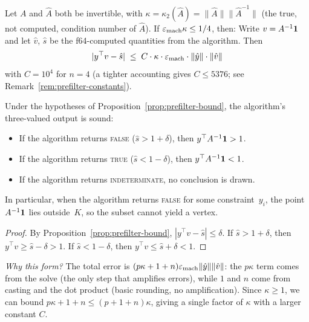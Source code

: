 \begin{unverified}
\begin{proposition}\label{prop:prefilter-bound}
Let $A$ and $\hat{A}$ both be invertible, with
$\kappa = \kappa_2(\hat{A}) = \|\hat{A}\|\|\hat{A}^{-1}\|$
(the true, not computed, condition number of $\hat{A}$).
If $\varepsilon_{\mathrm{mach}}\kappa \le 1/4$, then:
Write $v = A^{-1}\mathbf{1}$ and let $\hat{v}$, $\hat{s}$
be the f64-computed quantities from the algorithm.
Then
\[
  |y^\top v - \hat{s}|
  \;\le\;
  C \cdot \kappa \cdot \varepsilon_{\mathrm{mach}}
  \cdot \|\hat{y}\| \cdot \|\hat{v}\|
\]
with $C = 10^4$ for $n = 4$
(a tighter accounting gives $C \le 5376$; see
Remark~\ref{rem:prefilter-constants}).
\end{proposition}
\end{unverified}

\begin{unverified}
\begin{corollary}\label{cor:prefilter-soundness}
Under the hypotheses of Proposition~\ref{prop:prefilter-bound},
the algorithm's three-valued output is sound:
\begin{itemize}
\item If the algorithm returns \textsc{false}
  ($\hat{s} > 1 + \delta$), then $y^\top A^{-1}\mathbf{1} > 1$.
\item If the algorithm returns \textsc{true}
  ($\hat{s} < 1 - \delta$), then $y^\top A^{-1}\mathbf{1} < 1$.
\item If the algorithm returns \textsc{indeterminate},
  no conclusion is drawn.
\end{itemize}
In particular, when the algorithm returns \textsc{false}
for some constraint~$y_i$, the point $A^{-1}\mathbf{1}$ lies
outside~$K$, so the subset cannot yield a vertex.
\end{corollary}

\begin{proof}
By Proposition~\ref{prop:prefilter-bound},
$|y^\top v - \hat{s}| \le \delta$.
If $\hat{s} > 1 + \delta$, then
$y^\top v \ge \hat{s} - \delta > 1$.
If $\hat{s} < 1 - \delta$, then
$y^\top v \le \hat{s} + \delta < 1$.
\end{proof}
\end{unverified}

\noindent
\textit{Why this form?}
The total error is $(p\kappa + 1 + n)\varepsilon_{\mathrm{mach}}\|\hat{y}\|\|\hat{v}\|$:
the $p\kappa$ term comes from the solve (the only step that
amplifies errors), while $1$ and $n$ come from casting and
the dot product (basic rounding, no amplification).
Since $\kappa \ge 1$, we can bound
$p\kappa + 1 + n \le (p + 1 + n)\kappa$,
giving a single factor of $\kappa$ with a larger constant $C$.

